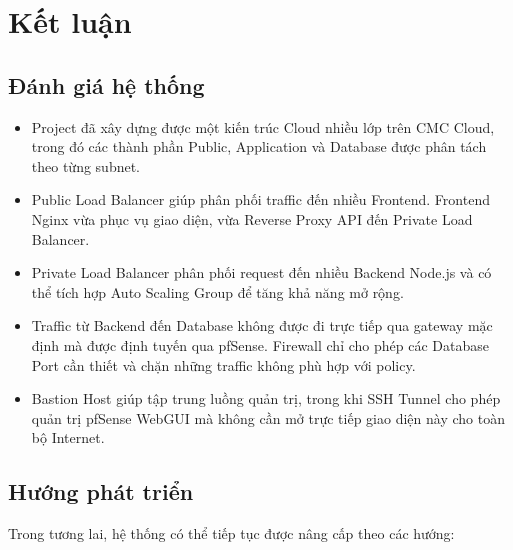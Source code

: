 \documentclass[12pt, a4paper]{article}
\begin{document}

\section{Kết luận}

\subsection{Đánh giá hệ thống}

\begin{itemize}

\item Project đã xây dựng được một kiến trúc Cloud nhiều lớp trên CMC Cloud, trong đó các thành phần Public, Application và Database được phân tách
theo từng subnet.

\item Public Load Balancer giúp phân phối traffic đến nhiều Frontend.
Frontend Nginx vừa phục vụ giao diện, vừa Reverse Proxy API
đến Private Load Balancer.

\item Private Load Balancer phân phối request đến nhiều Backend Node.js
và có thể tích hợp Auto Scaling Group để tăng khả năng mở rộng.

\item Traffic từ Backend đến Database không được đi trực tiếp qua
gateway mặc định mà được định tuyến qua pfSense.
Firewall chỉ cho phép các Database Port cần thiết và chặn những
traffic không phù hợp với policy.

\item Bastion Host giúp tập trung luồng quản trị,
trong khi SSH Tunnel cho phép quản trị pfSense WebGUI
mà không cần mở trực tiếp giao diện này cho toàn bộ Internet.

\end{itemize}
\subsection{Hướng phát triển}

Trong tương lai, hệ thống có thể tiếp tục được nâng cấp theo các hướng:
\end{document}
